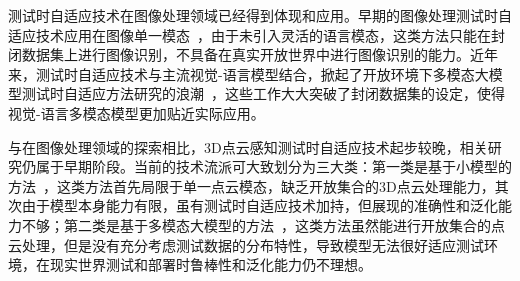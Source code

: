 \documentclass[12pt]{article}
\begin{document}
测试时自适应技术在图像处理领域已经得到体现和应用。早期的图像处理测试时自适应技术应用在图像单一模态~\cite{liang20shot,liang22source,wang21tent,zhang22memo,sun20ttt,liu21ttt++,gandelsman22ttt-mae,iwasawa21t3a,zhang22memo}，由于未引入灵活的语言模态，这类方法只能在封闭数据集上进行图像识别，不具备在真实开放世界中进行图像识别的能力。近年来，测试时自适应技术与主流视觉-语言模型结合，掀起了开放环境下多模态大模型测试时自适应方法研究的浪潮~\cite{shu22tpt,feng23difftpt,tsai24gda,karmanov24tda,zanella24meanshift,farina24zero,guan2025sca,cha2025snap}，这些工作大大突破了封闭数据集的设定，使得视觉-语言多模态模型更加贴近实际应用。












与在图像处理领域的探索相比，3D点云感知测试时自适应技术起步较晚，相关研究仍属于早期阶段。当前的技术流派可大致划分为三大类：第一类是基于小模型的方法~\cite{mirza23mate,wang24bftt3d,shim24cloudfixer}，这类方法首先局限于单一点云模态，缺乏开放集合的3D点云处理能力，其次由于模型本身能力有限，虽有测试时自适应技术加持，但展现的准确性和泛化能力不够；第二类是基于多模态大模型的方法~\cite{sun25pointcache,tamjidi2025uniadapter}，这类方法虽然能进行开放集合的点云处理，但是没有充分考虑测试数据的分布特性，导致模型无法很好适应测试环境，在现实世界测试和部署时鲁棒性和泛化能力仍不理想。
\end{document}
